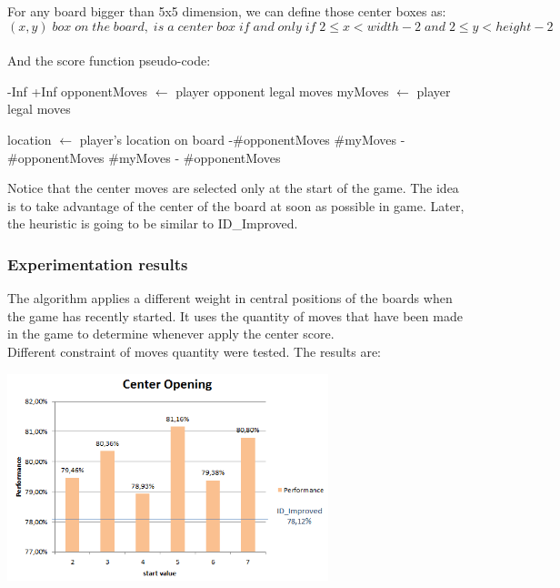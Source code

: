 \documentclass[10pt, a4paper,english]{article}
\begin{document}
For any board bigger than 5x5 dimension, we can define those center boxes as: \\
\[
(x,y) \;box \; on \; the \; board, \;is\; a\; center\; box\; if\; and\; only\; if\; 2 \leq x < width -2 \;and \; 2 \leq y < height - 2
\]
\\
And the score function pseudo-code:\\

\begin{algorithmic}
    \State\Return -Inf
\EndIf    
{}
   \State \Return +Inf
\Else
    \State opponentMoves $\leftarrow$ player opponent legal moves
  	\State myMoves $\leftarrow$ player legal moves
    
		\State location $\leftarrow$ player's location on board
        	\State{}-\#opponentMoves
        \Else
        	\State\Return \#myMoves -  \#opponentMoves
        \EndIf
    \Else
    	\State\Return \#myMoves -  \#opponentMoves
	\EndIf
\EndIf
\EndFunction
\end{algorithmic}

Notice that the center moves are selected only at the start of the game. The idea is to take advantage of the center of the board at soon as possible in game. Later, the heuristic is going to be similar to ID\_Improved.\\

\subsubsection{Experimentation results}

The algorithm applies a different weight in central positions of the boards when the game has recently started. It uses the quantity of moves that have been made in the game to determine whenever apply the center score. \\

Different constraint of moves quantity were tested. The results are:\\

\begin{center}
\includegraphics[width=0.7\textwidth]{centeropening.png}\\
\end{center}
\end{document}
